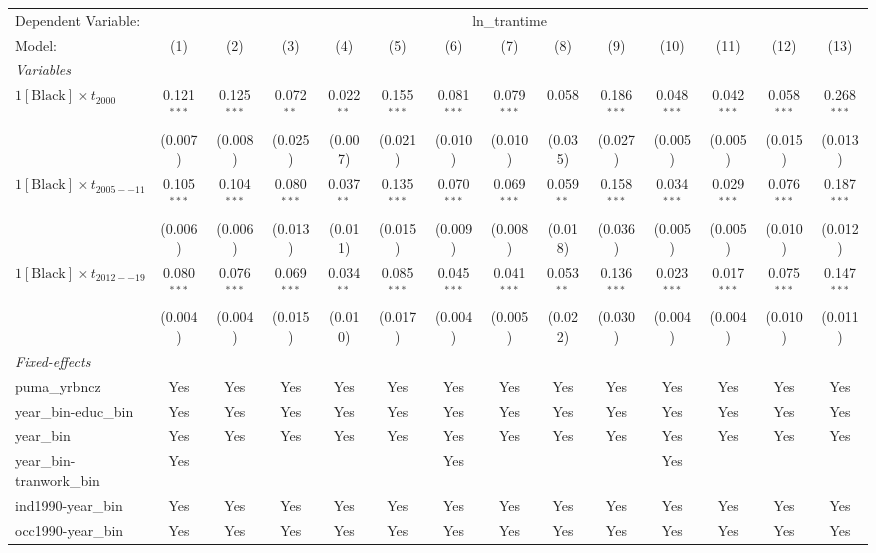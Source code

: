 \begin{tabular}{lccccccccccccc}
\tabularnewline\midrule\midrule
Dependent Variable:&\multicolumn{13}{c}{ln\_trantime}\\
Model:&(1) & (2) & (3) & (4) & (5) & (6) & (7) & (8) & (9) & (10) & (11) & (12) & (13)\\
\midrule \emph{Variables}&   &   &   &   &   &   &   &   &   &   &   &   &  \\
$1[\text{Black}] \times t_{2000}$ & 0.121$^{***}$ & 0.125$^{***}$ & 0.072$^{**}$ & 0.022$^{**}$ & 0.155$^{***}$ & 0.081$^{***}$ & 0.079$^{***}$ & 0.058 & 0.186$^{***}$ & 0.048$^{***}$ & 0.042$^{***}$ & 0.058$^{***}$ & 0.268$^{***}$\\
  &(0.007) & (0.008) & (0.025) & (0.007) & (0.021) & (0.010) & (0.010) & (0.035) & (0.027) & (0.005) & (0.005) & (0.015) & (0.013)\\
$1[\text{Black}] \times t_{2005--11}$ & 0.105$^{***}$ & 0.104$^{***}$ & 0.080$^{***}$ & 0.037$^{**}$ & 0.135$^{***}$ & 0.070$^{***}$ & 0.069$^{***}$ & 0.059$^{**}$ & 0.158$^{***}$ & 0.034$^{***}$ & 0.029$^{***}$ & 0.076$^{***}$ & 0.187$^{***}$\\
  &(0.006) & (0.006) & (0.013) & (0.011) & (0.015) & (0.009) & (0.008) & (0.018) & (0.036) & (0.005) & (0.005) & (0.010) & (0.012)\\
$1[\text{Black}] \times t_{2012--19}$ & 0.080$^{***}$ & 0.076$^{***}$ & 0.069$^{***}$ & 0.034$^{**}$ & 0.085$^{***}$ & 0.045$^{***}$ & 0.041$^{***}$ & 0.053$^{**}$ & 0.136$^{***}$ & 0.023$^{***}$ & 0.017$^{***}$ & 0.075$^{***}$ & 0.147$^{***}$\\
  &(0.004) & (0.004) & (0.015) & (0.010) & (0.017) & (0.004) & (0.005) & (0.022) & (0.030) & (0.004) & (0.004) & (0.010) & (0.011)\\
\midrule \emph{Fixed-effects}&   &   &   &   &   &   &   &   &   &   &   &   &  \\
puma\_yrbncz & Yes & Yes & Yes & Yes & Yes & Yes & Yes & Yes & Yes & Yes & Yes & Yes & Yes\\
year\_bin-educ\_bin & Yes & Yes & Yes & Yes & Yes & Yes & Yes & Yes & Yes & Yes & Yes & Yes & Yes\\
year\_bin & Yes & Yes & Yes & Yes & Yes & Yes & Yes & Yes & Yes & Yes & Yes & Yes & Yes\\
year\_bin-tranwork\_bin & Yes &  &  &  &  & Yes &  &  &  & Yes &  &  & \\
ind1990-year\_bin & Yes & Yes & Yes & Yes & Yes & Yes & Yes & Yes & Yes & Yes & Yes & Yes & Yes\\
occ1990-year\_bin & Yes & Yes & Yes & Yes & Yes & Yes & Yes & Yes & Yes & Yes & Yes & Yes & Yes\\

\end{tabular}
